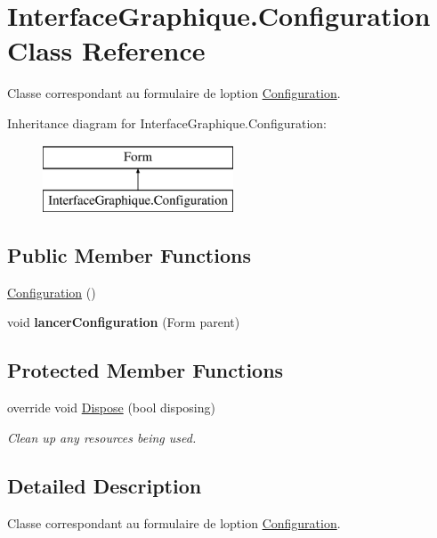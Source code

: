 \hypertarget{class_interface_graphique_1_1_configuration}{}\section{Interface\+Graphique.\+Configuration Class Reference}
\label{class_interface_graphique_1_1_configuration}


Classe correspondant au formulaire de l\textquotesingle{}option \hyperlink{class_interface_graphique_1_1_configuration}{Configuration}.  


Inheritance diagram for Interface\+Graphique.\+Configuration\+:\begin{figure}[H]
\begin{center}
\leavevmode
\includegraphics[height=2.000000cm]{class_interface_graphique_1_1_configuration}
\end{center}
\end{figure}
\subsection*{Public Member Functions}
\begin{DoxyCompactItemize}
\item 
\hyperlink{group__inf2990_gad326532d6f7176c99056037fccbce6fa}{Configuration} ()
\item 
void {\bfseries lancer\+Configuration} (Form parent)
\end{DoxyCompactItemize}
\subsection*{Protected Member Functions}
\begin{DoxyCompactItemize}
\item 
override void \hyperlink{class_interface_graphique_1_1_configuration_a0200b084946b5710be7d94f9e8b0385c}{Dispose} (bool disposing)
\begin{DoxyCompactList}\small\item\em Clean up any resources being used. \end{DoxyCompactList}\end{DoxyCompactItemize}


\subsection{Detailed Description}
Classe correspondant au formulaire de l\textquotesingle{}option \hyperlink{class_interface_graphique_1_1_configuration}{Configuration}. 

